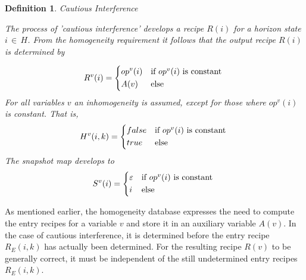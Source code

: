 \documentclass[12pt,a4paper]{scrartcl}
\newtheorem{definition}{Definition}
\begin{document}
\begin{definition}
Cautious Interference

The process of 'cautious interference' develops a recipe $R(i)$ for a horizon state
$i\,\in\,H$.  From the homogeneity requirement it follows that the output
recipe $R(i)$ is determined by 
          
\begin{equation} \label{eq:cautious-output-recipe}
    R^v(i) = \begin{dcases*}
              op^v(i) & if $op^v(i)$ is constant \\
              A(v)    & else
             \end{dcases*}
\end{equation}
For all variables $v$ an inhomogeneity is assumed, except for those where $op^v(i)$
is constant. That is,
\begin{equation} \label{eq:cautious-homogeneity}
    H^v(i,k) = \begin{dcases*}
                     false & if $op^v(i)$ is constant \\
                     true  & else
                 \end{dcases*}
\end{equation}
The snapshot map develops to
\begin{equation} \label{eq:cautious-interference-snapshot}
    S^v(i) = \begin{dcases*}
                \varepsilon & if $op^v(i)$ is constant \\
                i           & else
             \end{dcases*}
\end{equation}
\end{definition}

As mentioned earlier, the homogeneity database expresses the need to compute
the entry recipes for a variable $v$ and store it in an auxiliary variable
$A(v)$. In the case of cautious interference, it is determined before the entry
recipe $R_E(i,k)$ has actually been determined.  For the resulting recipe
$R(v)$ to be generally correct, it must be independent of the still
undetermined entry recipes $R_E(i,k)$. 
\end{document}
